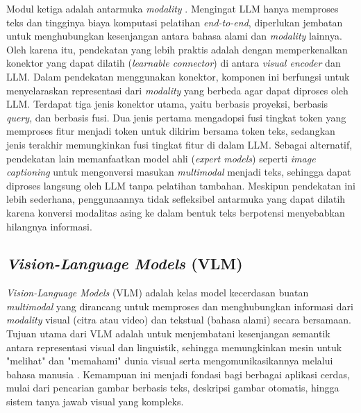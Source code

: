 Modul ketiga adalah antarmuka \textit{modality} \parencite{yinSurveyMultimodalLarge2024}. Mengingat LLM hanya memproses teks dan tingginya biaya komputasi pelatihan \textit{end-to-end}, diperlukan jembatan untuk menghubungkan kesenjangan antara bahasa alami dan \textit{modality} lainnya. Oleh karena itu, pendekatan yang lebih praktis adalah dengan memperkenalkan konektor yang dapat dilatih (\textit{learnable connector}) di antara \textit{visual encoder} dan LLM. Dalam pendekatan menggunakan konektor, komponen ini berfungsi untuk menyelaraskan representasi dari \textit{modality} yang berbeda agar dapat diproses oleh LLM. Terdapat tiga jenis konektor utama, yaitu berbasis proyeksi, berbasis \textit{query}, dan berbasis fusi. Dua jenis pertama mengadopsi fusi tingkat token yang memproses fitur menjadi token untuk dikirim bersama token teks, sedangkan jenis terakhir memungkinkan fusi tingkat fitur di dalam LLM. Sebagai alternatif, pendekatan lain memanfaatkan model ahli (\textit{expert models}) seperti \textit{image captioning} untuk mengonversi masukan \textit{multimodal} menjadi teks, sehingga dapat diproses langsung oleh LLM tanpa pelatihan tambahan. Meskipun pendekatan ini lebih sederhana, penggunaannya tidak sefleksibel antarmuka yang dapat dilatih karena konversi modalitas asing ke dalam bentuk teks berpotensi menyebabkan hilangnya informasi.

\subsection{\textit{Vision-Language Models} (VLM)}
\textit{Vision-Language Models} (VLM) adalah kelas model kecerdasan buatan \textit{multimodal} yang dirancang untuk memproses dan menghubungkan informasi dari \textit{modality} visual (citra atau video) dan tekstual (bahasa alami) secara bersamaan. Tujuan utama dari VLM adalah untuk menjembatani kesenjangan semantik antara representasi visual dan linguistik, sehingga memungkinkan mesin untuk "melihat" dan "memahami" dunia visual serta mengomunikasikannya melalui bahasa manusia \parencite{bordesIntroductionVisionLanguageModeling2024}. Kemampuan ini menjadi fondasi bagi berbagai aplikasi cerdas, mulai dari pencarian gambar berbasis teks, deskripsi gambar otomatis, hingga sistem tanya jawab visual yang kompleks.

